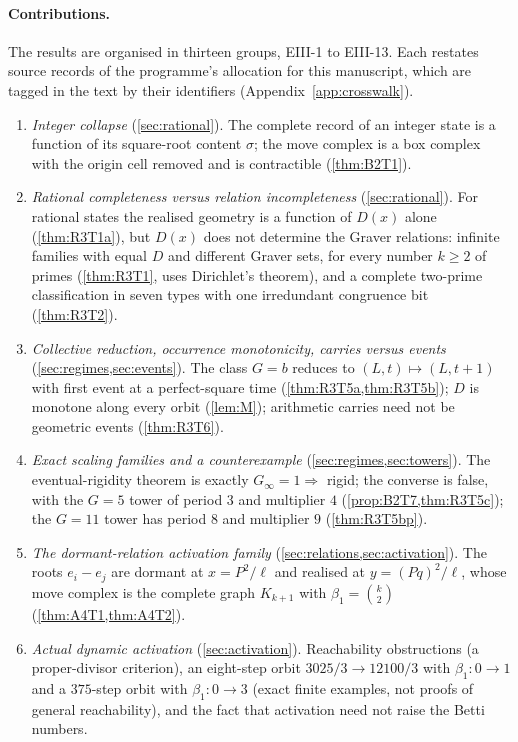 \paragraph{Contributions.}
The results are organised in thirteen groups, EIII-1 to EIII-13. Each restates source records of the programme's allocation for this manuscript, which are tagged in the text by their identifiers (Appendix~\ref{app:crosswalk}).
\begin{enumerate}[leftmargin=2.7em,itemsep=2pt]
\item[\textbf{EIII-1}] \emph{Integer collapse} (\cref{sec:rational}). The complete record of an integer state is a function of its square-root content $\sigma$; the move complex is a box complex with the origin cell removed and is contractible (\cref{thm:B2T1}).
\item[\textbf{EIII-2}] \emph{Rational completeness versus relation incompleteness} (\cref{sec:rational}). For rational states the realised geometry is a function of $D(x)$ alone (\cref{thm:R3T1a}), but $D(x)$ does not determine the Graver relations: infinite families with equal $D$ and different Graver sets, for every number $k\ge2$ of primes (\cref{thm:R3T1}, uses Dirichlet's theorem), and a complete two-prime classification in seven types with one irredundant congruence bit (\cref{thm:R3T2}).
\item[\textbf{EIII-3}] \emph{Collective reduction, occurrence monotonicity, carries versus events} (\cref{sec:regimes,sec:events}). The class $G=b$ reduces to $(L,t)\mapsto(L,t+1)$ with first event at a perfect-square time (\cref{thm:R3T5a,thm:R3T5b}); $D$ is monotone along every orbit (\cref{lem:M}); arithmetic carries need not be geometric events (\cref{thm:R3T6}).
\item[\textbf{EIII-4}] \emph{Exact scaling families and a counterexample} (\cref{sec:regimes,sec:towers}). The eventual-rigidity theorem is exactly $G_\infty=1\Rightarrow$ rigid; the converse is false, with the $G=5$ tower of period $3$ and multiplier $4$ (\cref{prop:B2T7,thm:R3T5c}); the $G=11$ tower has period $8$ and multiplier $9$ (\cref{thm:R3T5bp}).
\item[\textbf{EIII-5}] \emph{The dormant-relation activation family} (\cref{sec:relations,sec:activation}). The roots $e_i-e_j$ are dormant at $x=P^2/\ell$ and realised at $y=(Pq)^2/\ell$, whose move complex is the complete graph $K_{k+1}$ with $\beta_1=\binom k2$ (\cref{thm:A4T1,thm:A4T2}).
\item[\textbf{EIII-6}] \emph{Actual dynamic activation} (\cref{sec:activation}). Reachability obstructions (a proper-divisor criterion), an eight-step orbit $3025/3\to12100/3$ with $\beta_1:0\to1$ and a $375$-step orbit with $\beta_1:0\to3$ (exact finite examples, not proofs of general reachability), and the fact that activation need not raise the Betti numbers.

\end{enumerate}
